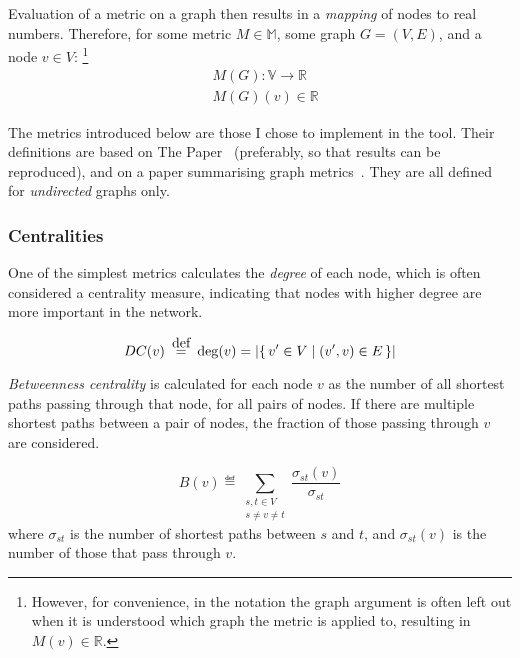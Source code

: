 Evaluation of a metric on a graph then results in a \textsl{mapping} of nodes to real numbers.
Therefore, for some metric $M \in \mathbb{M}$, some graph $G = (V, E)$, and a node $v \in V$: \footnote{However, for convenience, in the notation the graph argument is often left out when it is understood which graph the metric is applied to, resulting in $M(v) \in \mathbb{R}$.}
\begin{align}
    &M(G) : \mathbb{V} \rightarrow \mathbb{R}\\
    &M(G)(v) \in \mathbb{R}
\end{align}

The metrics introduced below are those I chose to implement in the \graffs tool.
Their definitions are based on The Paper~\cite{Bozhilova2019} (preferably, so that results can be reproduced), and on a paper summarising graph metrics~\cite{MartinHernandez2011}.
They are all defined for \textsl{undirected} graphs only.

\subsubsection*{Centralities}

One of the simplest metrics calculates the \textsl{degree} of each node, which is often considered a centrality measure, indicating that nodes with higher degree are more important in the network.
\begin{definition}
    \vspace*{-7mm}
    \begin{equation*}
        DC(v) \eqdef \deg(v) = \left\lvert \Set{v' \in V}{(v', v) \in E} \right\rvert
    \end{equation*}
\end{definition}

\textsl{Betweenness centrality} is calculated for each node $v$ as the number of all shortest paths passing through that node, for all pairs of nodes.
If there are multiple shortest paths between a pair of nodes, the fraction of those passing through $v$ are considered.
\begin{definition}
    \vspace*{-5mm}
    \begin{equation*}
        B(v) \eqdef \sum_{\substack{s,t \in V \\ s \ne v \ne t}} \frac{ \sigma_{st}(v) }{ \sigma_{st} }
    \end{equation*}
    where $\sigma_{st}$ is the number of shortest paths between $s$ and $t$, and $\sigma_{st}(v)$ is the number of those that pass through $v$.
\end{definition}

